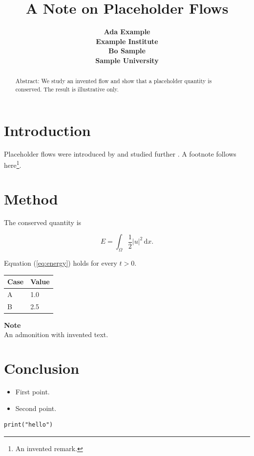 \documentclass{article}
\title{A Note on Placeholder Flows}
\date{\displaydate{articleDate}}
\author{\bfseries Ada Example\mdseries\\Example Institute\\\AND\bfseries Bo Sample\mdseries\\Sample University\\}
\begin{document}
\maketitle
\begin{abstract}
Abstract: We study an invented flow and show that a placeholder quantity is conserved.
The result is illustrative only.
\end{abstract}

\section{Introduction}

Placeholder flows were introduced by \cite{doe2020} and studied further \citep{doe2020}.
A footnote follows here\footnote{An invented remark.}.

\section{Method}

The conserved quantity is

\begin{equation}
\label{eq:energy}
E = \int_\Omega \frac{1}{2} |u|^2 \, \mathrm{d}x .
\end{equation}

Equation (\ref{eq:energy}) holds for every $t > 0$.

\bigskip\noindent
\begin{tabular}{p{}p{}}
\toprule
Case & Value \\
\hline
A & 1.0 \\
B & 2.5 \\
\bottomrule
\end{tabular}

\bigskip

\begin{framed}
\textbf{Note}\\
An admonition with invented text.
\end{framed}

\section{Conclusion}

\begin{itemize}
\item First point.
\item Second point.
\end{itemize}

\begin{verbatim}
print("hello")
\end{verbatim}

\clearpage

\end{document}
